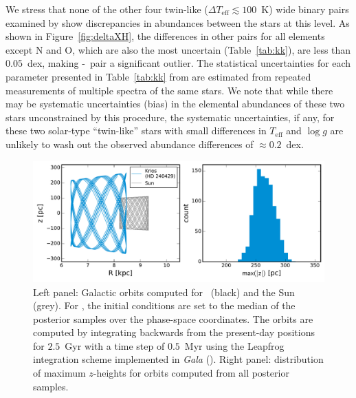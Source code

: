 \documentclass[modern, letterpaper]{aastex61}
\newcommand{\project}[1]{\textsl{#1}}
\newcommand{\figname}{Figure}
\newcommand*\elem[1]{\ensuremath{\mathrm{#1}}}
\newcommand{\sunanalog}{\text{Krios}}
\newcommand{\bizarreone}{\text{Kronos}}
\renewcommand\tablename{Table}
\begin{document}
We stress that none of the other four twin-like ($\Delta T_\mathrm{eff}
\lesssim 100$~K) wide binary pairs examined by \citealt{2016ApJS..225...32B}
show discrepancies in abundances between the stars at this level.
As shown in \figname~\ref{fig:deltaXH},
the differences in other pairs for all elements except \elem{N} and \elem{O},
which are also the most uncertain (\tablename~\ref{tab:kk}),
are less than $0.05$~dex, making \bizarreone-\sunanalog\ pair a significant outlier.
The statistical uncertainties for each parameter
presented in \tablename~\ref{tab:kk} from \citealt{2016ApJS..225...32B}
are estimated from repeated measurements of multiple spectra of the same stars.
We note that while there may be systematic uncertainties (bias) in the elemental
abundances of these two stars unconstrained by this procedure,
the systematic uncertainties, if any, for these two solar-type ``twin-like'' stars
with small differences in $T_\mathrm{eff}$ and $\log{g}$ are unlikely to wash out
the observed abundance differences of $\approx 0.2$~dex.

\begin{figure}[htbp]
  \begin{center}
    \includegraphics[width=\linewidth]{orbits.pdf}
  \end{center}
  \caption{Left panel: Galactic orbits computed for \sunanalog\ (black) and the
    Sun (grey).
    For \sunanalog, the initial conditions are set to the median of the
    posterior samples over the phase-space coordinates.
    The orbits are computed by integrating backwards from the present-day
    positions for $2.5$~Gyr with a time step of $0.5$~Myr using the Leapfrog
    integration scheme implemented in \project{Gala} (\citealt{gala}).
    Right panel: distribution of maximum $z$-heights for orbits computed from
    all posterior samples.
  }
  \label{fig:orbit}
\end{figure}
\end{document}
